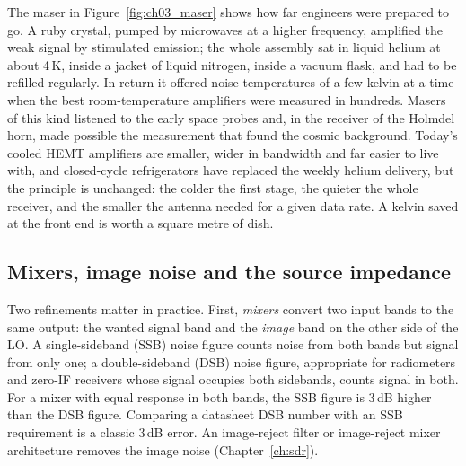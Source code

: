 The maser in Figure~\ref{fig:ch03_maser} shows how far engineers were prepared to go. A ruby crystal,
pumped by microwaves at a higher frequency, amplified the weak signal by stimulated emission; the whole
assembly sat in liquid helium at about 4\,K, inside a jacket of liquid nitrogen, inside a vacuum flask,
and had to be refilled regularly. In return it offered noise temperatures of a few kelvin at a time when
the best room-temperature amplifiers were measured in hundreds. Masers of this kind listened to the early
space probes and, in the receiver of the Holmdel horn, made possible the measurement that found the cosmic
background. Today's cooled HEMT amplifiers are smaller, wider in bandwidth and far easier to live with,
and closed-cycle refrigerators have replaced the weekly helium delivery, but the principle is unchanged:
the colder the first stage, the quieter the whole receiver, and the smaller the antenna needed for a given
data rate. A kelvin saved at the front end is worth a square metre of dish.


\subsection{Mixers, image noise and the source impedance}

Two refinements matter in practice. First, \emph{mixers} convert two input bands to the same output: the
wanted signal band and the \emph{image} band on the other side of the LO. A single-sideband (SSB) noise
figure counts noise from both bands but signal from only one; a double-sideband (DSB) noise figure,
appropriate for radiometers and zero-IF receivers whose signal occupies both sidebands, counts signal in
both. For a mixer with equal response in both bands, the SSB figure is 3\,dB higher than the DSB figure.
Comparing a datasheet DSB number with an SSB requirement is a classic 3\,dB error. An image-reject filter
or image-reject mixer architecture removes the image noise (Chapter~\ref{ch:sdr}).

